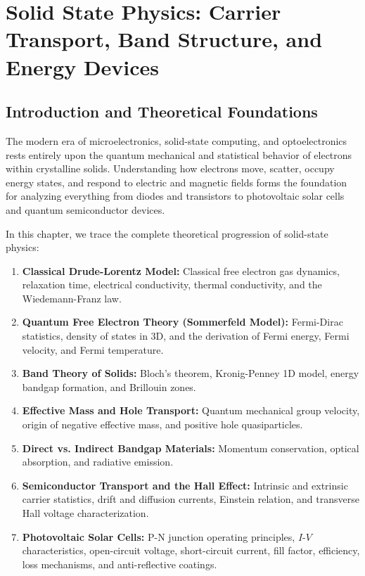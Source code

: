 \chapter{Solid State Physics: Carrier Transport, Band Structure, and Energy Devices}
\label{chap:solid_state_physics}

\section{Introduction and Theoretical Foundations}
The modern era of microelectronics, solid-state computing, and optoelectronics rests entirely upon the quantum mechanical and statistical behavior of electrons within crystalline solids. Understanding how electrons move, scatter, occupy energy states, and respond to electric and magnetic fields forms the foundation for analyzing everything from diodes and transistors to photovoltaic solar cells and quantum semiconductor devices.

In this chapter, we trace the complete theoretical progression of solid-state physics:
\begin{enumerate}
    \item \textbf{Classical Drude-Lorentz Model:} Classical free electron gas dynamics, relaxation time, electrical conductivity, thermal conductivity, and the Wiedemann-Franz law.
    \item \textbf{Quantum Free Electron Theory (Sommerfeld Model):} Fermi-Dirac statistics, density of states in 3D, and the derivation of Fermi energy, Fermi velocity, and Fermi temperature.
    \item \textbf{Band Theory of Solids:} Bloch's theorem, Kronig-Penney 1D model, energy bandgap formation, and Brillouin zones.
    \item \textbf{Effective Mass and Hole Transport:} Quantum mechanical group velocity, origin of negative effective mass, and positive hole quasiparticles.
    \item \textbf{Direct vs. Indirect Bandgap Materials:} Momentum conservation, optical absorption, and radiative emission.
    \item \textbf{Semiconductor Transport and the Hall Effect:} Intrinsic and extrinsic carrier statistics, drift and diffusion currents, Einstein relation, and transverse Hall voltage characterization.
    \item \textbf{Photovoltaic Solar Cells:} P-N junction operating principles, $I$-$V$ characteristics, open-circuit voltage, short-circuit current, fill factor, efficiency, loss mechanisms, and anti-reflective coatings.
\end{enumerate}

